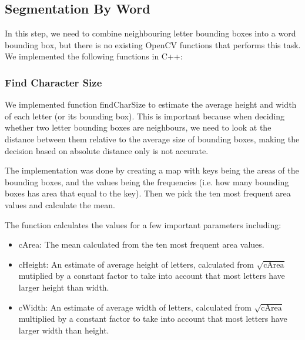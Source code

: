 \documentclass[conference]{IEEEtran}
\begin{document}
\subsection{Segmentation By Word}

In this step, we need to combine neighbouring letter bounding boxes into a word bounding box, but there is no existing OpenCV functions that performs this task.  We implemented the following functions in C++:

\subsubsection{Find Character Size}
We implemented function findCharSize to estimate the average height and width of each letter (or its bounding box).  This is important because when deciding whether two letter bounding boxes are neighbours, we need to look at the distance between them relative to the average size of bounding boxes, making the decision based on absolute distance only is not accurate.

The implementation was done by creating a map with keys being the areas of the bounding boxes, and the values being the frequencies (i.e. how many bounding boxes has area that equal to the key).  Then we pick the ten most frequent area values and calculate the mean.

The function calculates the values for a few important parameters including:
\begin{itemize}
\item cArea: The mean calculated from the ten most frequent area values.
\item cHeight: An estimate of average height of letters, calculated from $\sqrt{\mbox{cArea}}$ mutiplied by a constant factor to take into account that most letters have larger height than width.
\item cWidth: An estimate of average width of letters, calculated from $\sqrt{\mbox{cArea}}$ multiplied by a constant factor to take into account that most letters have larger width than height.
\end{itemize}
\end{document}
